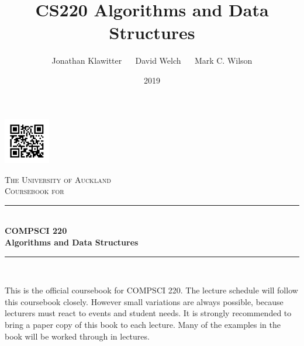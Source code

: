 \documentclass[11pt,oneside]{memoir}
\theoremstyle{definition}
\numberwithin{Lemma}{chapter}
\numberwithin{Exercise}{section}
\theoremstyle{remark}
\begin{document}
\title{CS220 Algorithms and Data Structures}
\author{Jonathan Klawitter $\quad$ David Welch $\quad$ Mark C. Wilson}
\date{2019}

\begin{titlingpage}
\newcommand{\HRule}{\rule{\linewidth}{0.5mm}}
\setlength{\droptitle}{30pt} 
\begin{adjustwidth*}{1cm}{-2cm}
\centering

\hfill \includegraphics[height = 2cm]{qrcode}

\vspace*{0.4cm}
\textsc{\LARGE The University of Auckland}\\[3cm]

\textsc{\Large Coursebook for}\\[0.4cm]

\HRule\\[0.5cm]
\Huge{\bfseries COMPSCI 220\\ 
Algorithms and Data Structures}\\[0.1cm]
\HRule\\[0.5cm]
\Large{\thedate}

\vspace*{2.4cm}
\LARGE{\theauthor}

\end{adjustwidth*}
\end{titlingpage}



\setcounter{page}{1}






{}

\thispagestyle{empty}
This is the official coursebook for COMPSCI 220. The lecture schedule will follow this coursebook closely. However small variations are always possible, because lecturers must react to events and student needs. It is strongly recommended to bring a paper copy of this book to each lecture. Many of the examples in the book will be worked through in lectures.
\end{document}
